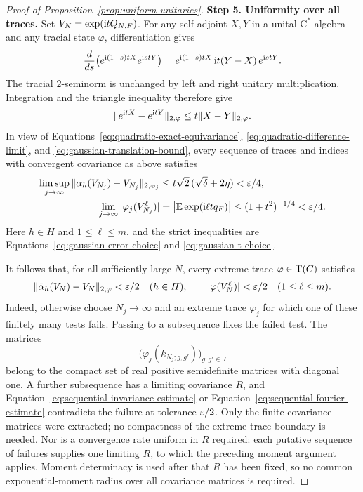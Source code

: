 \begin{proof}[Proof of Proposition~\ref{prop:uniform-unitaries}]
\textbf{Step 5. Uniformity over all traces.}
Set \(V_N=\exp(\mathrm{i} tQ_{N,F})\). For any self-adjoint \(X,Y\)
in a unital \(\mathrm{C}^*\)-algebra and any tracial state
\(\varphi\), differentiation gives
\[
 \frac{d}{ds}
 \bigl(e^{\mathrm{i}(1-s)tX}e^{\mathrm{i} stY}\bigr)
 =e^{\mathrm{i}(1-s)tX}\,\mathrm{i} t(Y-X)\,e^{\mathrm{i} stY}.
\]
The tracial \(2\)-seminorm is unchanged by left and right
unitary multiplication. Integration and the triangle inequality
therefore give
\begin{equation}\label{eq:tracial-duhamel}
 \|e^{\mathrm{i} tX}-e^{\mathrm{i} tY}\|_{2,\varphi}
 \leq t\|X-Y\|_{2,\varphi}.
\end{equation}
In view of Equations~\eqref{eq:quadratic-exact-equivariance},
\eqref{eq:quadratic-difference-limit}, and
\eqref{eq:gaussian-translation-bound}, every sequence of traces
and indices with convergent covariance as above satisfies
\begin{align}
 \limsup_{j\to\infty}
 \|\bar\alpha_h(V_{N_j})-V_{N_j}\|_{2,\varphi_j}
 &\leq t\sqrt{2}\,(\sqrt{\delta}+2\eta)<\varepsilon/4,
 \label{eq:sequential-invariance-estimate}\\
 \lim_{j\to\infty}|\varphi_j(V_{N_j}^{\ell})|
 &=
 \bigl|\mathbb E\exp(\mathrm{i}\ell t q_F)\bigr|
 \leq(1+t^2)^{-1/4}<\varepsilon/4.
 \label{eq:sequential-fourier-estimate}
\end{align}
Here \(h\in H\) and \(1\leq\ell\leq m\), and the strict
inequalities are Equations~\eqref{eq:gaussian-error-choice} and
\eqref{eq:gaussian-t-choice}.

It follows that, for all sufficiently large \(N\), every extreme
trace \(\varphi\in\operatorname{T}(C)\) satisfies
\begin{equation}\label{eq:extreme-uniform-estimates}
 \|\bar\alpha_h(V_N)-V_N\|_{2,\varphi}<\varepsilon/2
 \quad(h\in H),\qquad
 |\varphi(V_N^\ell)|<\varepsilon/2
 \quad(1\leq\ell\leq m).
\end{equation}
Indeed, otherwise choose \(N_j\to\infty\) and an extreme trace
\(\varphi_j\) for which one of these finitely many tests fails.
Passing to a subsequence fixes the failed test. The matrices
\[
 \bigl(\varphi_j(k_{N_j;g,g'})\bigr)_{g,g'\in J}
\]
belong to the compact set of real positive semidefinite matrices
with diagonal one. A further subsequence has a limiting
covariance \(R\), and
Equation~\eqref{eq:sequential-invariance-estimate} or
Equation~\eqref{eq:sequential-fourier-estimate} contradicts the failure
at tolerance \(\varepsilon/2\).
Only the finite covariance matrices were extracted; no
compactness of the extreme trace boundary is needed. Nor is a
convergence rate uniform in \(R\) required: each putative
sequence of failures supplies one limiting \(R\), to which the
preceding moment argument applies. Moment determinacy is used
after that \(R\) has been fixed, so no common exponential-moment
radius over all covariance matrices is required.


\end{proof}
